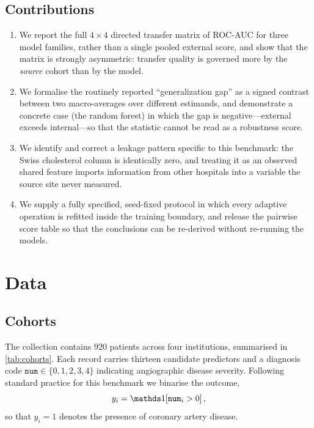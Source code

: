 \documentclass[manuscript,nonacm]{acmart}
\begin{document}
\subsection{Contributions}
\begin{enumerate}
\item We report the full $4\times4$ directed transfer matrix of ROC-AUC for three
      model families, rather than a single pooled external score, and show that the
      matrix is strongly asymmetric: transfer quality is governed more by the
      \emph{source} cohort than by the model.
\item We formalise the routinely reported ``generalization gap'' as a signed contrast
      between two macro-averages over different estimands, and demonstrate a concrete
      case (the random forest) in which the gap is negative---external exceeds
      internal---so that the statistic cannot be read as a robustness score.
\item We identify and correct a leakage pattern specific to this benchmark: the Swiss
      cholesterol column is identically zero, and treating it as an observed shared
      feature imports information from other hospitals into a variable the source site
      never measured.
\item We supply a fully specified, seed-fixed protocol in which every adaptive
      operation is refitted inside the training boundary, and release the pairwise
      score table so that the conclusions can be re-derived without re-running the
      models.
\end{enumerate}

\section{Data}
\subsection{Cohorts}
The collection contains $920$ patients across four institutions, summarised in
\cref{tab:cohorts}. Each record carries thirteen candidate predictors and a diagnosis
code $\texttt{num}\in\{0,1,2,3,4\}$ indicating angiographic disease severity. Following
standard practice for this benchmark we binarise the outcome,
\begin{equation}
y_i = \ind\!\left[\texttt{num}_i > 0\right],
\label{eq:target}
\end{equation}
so that $y_i=1$ denotes the presence of coronary artery disease.
\end{document}
